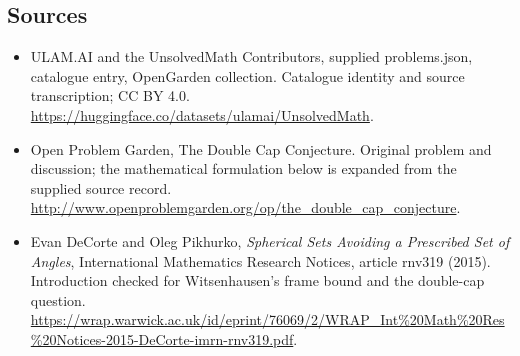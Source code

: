 \documentclass[11pt,a4paper]{article}
\begin{document}
\subsection{Sources}
\begin{itemize}
\item[S1] ULAM.AI and the UnsolvedMath Contributors, supplied problems.json, catalogue entry, OpenGarden collection. Catalogue identity and source transcription; CC BY 4.0.
\url{https://huggingface.co/datasets/ulamai/UnsolvedMath}.
\item[S2] Open Problem Garden, The Double Cap Conjecture. Original problem and discussion; the mathematical formulation below is expanded from the supplied source record.
\url{http://www.openproblemgarden.org/op/the_double_cap_conjecture}.

\item[R1] Evan DeCorte and Oleg Pikhurko, \emph{Spherical Sets
Avoiding a Prescribed Set of Angles}, International Mathematics
Research Notices, article rnv319 (2015). Introduction checked
for Witsenhausen's frame bound and the double-cap question.
\url{https://wrap.warwick.ac.uk/id/eprint/76069/2/WRAP_Int%20Math%20Res%20Notices-2015-DeCorte-imrn-rnv319.pdf}.

\end{itemize}
\end{document}
